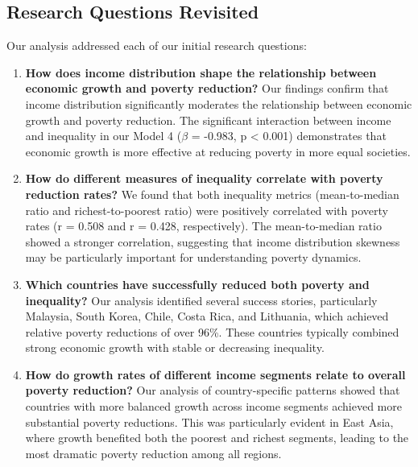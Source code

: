 \documentclass[12pt,a4paper]{article}
\begin{document}
\subsection{Research Questions Revisited}
Our analysis addressed each of our initial research questions:
\begin{enumerate}
    \item \textbf{How does income distribution shape the relationship between economic growth and poverty reduction?} Our findings confirm that income distribution significantly moderates the relationship between economic growth and poverty reduction. The significant interaction between income and inequality in our Model 4 ($\beta$ = -0.983, p < 0.001) demonstrates that economic growth is more effective at reducing poverty in more equal societies.
    \item \textbf{How do different measures of inequality correlate with poverty reduction rates?} We found that both inequality metrics (mean-to-median ratio and richest-to-poorest ratio) were positively correlated with poverty rates (r = 0.508 and r = 0.428, respectively). The mean-to-median ratio showed a stronger correlation, suggesting that income distribution skewness may be particularly important for understanding poverty dynamics.
    \item \textbf{Which countries have successfully reduced both poverty and inequality?} Our analysis identified several success stories, particularly Malaysia, South Korea, Chile, Costa Rica, and Lithuania, which achieved relative poverty reductions of over 96\%. These countries typically combined strong economic growth with stable or decreasing inequality.
    \item \textbf{How do growth rates of different income segments relate to overall poverty reduction?} Our analysis of country-specific patterns showed that countries with more balanced growth across income segments achieved more substantial poverty reductions. This was particularly evident in East Asia, where growth benefited both the poorest and richest segments, leading to the most dramatic poverty reduction among all regions.
\end{enumerate}
\end{document}
